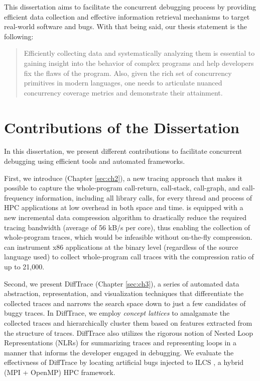 This dissertation aims to facilitate the concurrent debugging process by providing efficient data collection and effective information retrieval mechanisms to target real-world software and bugs.
%
With that being said, our thesis statement is the following:

\begin{quote}
Efficiently collecting data and systematically analyzing them is essential to gaining insight into the behavior of complex programs and help developers fix the flaws of the program. Also, given the rich set of concurrency primitives in modern languages, one needs to articulate nuanced concurrency coverage metrics and demonstrate their attainment.
\end{quote}

\section{Contributions of the Dissertation}
In this dissertation, we present different contributions to facilitate concurrent debugging using efficient tools and automated frameworks.
%

First, we introduce \parlot (Chapter \ref{sec:ch2}), a new tracing approach that makes it possible to capture the whole-program call-return, call-stack, call-graph, and call-frequency information, including all library calls, for every thread and process of HPC applications at low overhead in both space and time.
%
\parlot is equipped with a new incremental data compression algorithm to drastically reduce the required tracing bandwidth (average of 56 kB/s per core), thus enabling the collection of whole-program traces, which would be infeasible without on-the-fly compression.
%
\parlot can instrument x86 applications at the binary level (regardless of the source language used) to collect whole-program call traces with the compression ratio of up to 21,000.

Second, we present DiffTrace (Chapter \ref{sec:ch3}), a series of automated data abstraction, representation, and visualization techniques that differentiate the collected \parlot traces and narrows the search space down to just a few candidates of buggy traces.
%
In DiffTrace, we employ {\em concept lattices} to amalgamate the collected traces and hierarchically cluster them based on features extracted from the structure of traces.
%
DiffTrace also utilizes the rigorous notion of Nested Loop Representations (NLRs) for summarizing traces and representing loops in a manner that informs the developer engaged in debugging.
%
We evaluate the effectivness of DiffTrace by locating artificial bugs injected to ILCS \cite{ilcs}, a hybrid (MPI + OpenMP) HPC framework.

